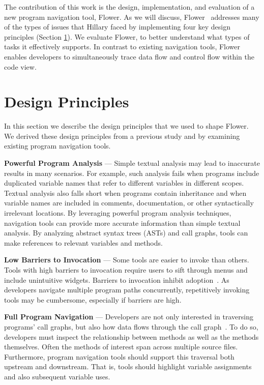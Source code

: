 \documentclass[conference]{IEEEtran}
\newcommand{\toolName}{Flower}
\begin{document}
The contribution of this work is the design, implementation, and evaluation of a new program navigation tool, \toolName.
As we will discuss, \toolName~ addresses many of the types of issues that Hillary faced by implementing four key design principles (Section \ref{DesignPrinciples}).
We evaluate \toolName, to better understand what types of tasks it effectively supports. 
In contrast to existing navigation tools, \toolName~ enables developers to simultaneously trace data flow and control flow within the code view. 


\section{Design Principles}
\label{DesignPrinciples}
In this section we describe the design principles that we used to shape \toolName. We derived these design principles from a previous study \cite{Smith2015} and by examining existing program navigation tools.
 
\vspace{1em} 
\noindent\textbf{Powerful Program Analysis} ---
Simple textual analysis may lead to inaccurate results in many scenarios. For example, such analysis fails when programs include duplicated variable names that refer to different variables in different scopes. Textual analysis also falls short when programs contain inheritance and when variable names are included in comments, documentation, or other syntactically irrelevant locations.
By leveraging powerful program analysis techniques, navigation tools can provide more accurate information than simple textual analysis.
By analyzing abstract syntax trees (ASTs) and call graphs, tools can make references to relevant variables and methods. 

\vspace{1em} 
\noindent\textbf{Low Barriers to Invocation} ---
Some tools are easier to invoke than others. 
Tools with high barriers to invocation require users to sift through menus and include unintuitive widgets. 
Barriers to invocation inhibit adoption~\cite{johnson2013don}.
As developers navigate multiple program paths concurrently, repetitively invoking tools may be cumbersome, especially if barriers are high. 


\vspace{1em} 
\noindent\textbf{Full Program Navigation}  ---
Developers are not only interested in traversing programs' call graphs, but also how data flows through the call graph~\cite{Smith2015}.
To do so, developers must inspect the relationship between methods as well as the methods themselves.
Often the methods of interest span across multiple source files.
Furthermore, program navigation tools should support this traversal both upstream and downstream. 
That is, tools should highlight variable assignments and also subsequent variable uses. 
\end{document}

